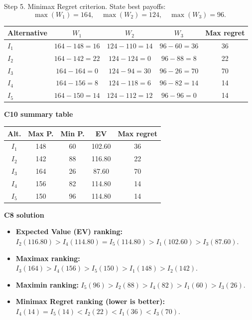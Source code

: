 \begin{ExamProblems}
		Step 5. Minimax Regret criterion.
		State best payoffs:
		\[
		\max(W_1)=164,\quad \max(W_2)=124,\quad \max(W_3)=96.
		\]
		\begin{center}
			\begin{tabular}{l c c c c}
				\toprule
				Alternative & $W_1$ & $W_2$ & $W_3$ & Max regret \\
				\midrule
				$I_1$ & $164-148=16$ & $124-110=14$ & $96-60=36$ & 36 \\
				$I_2$ & $164-142=22$ & $124-124=0$ & $96-88=8$ & 22 \\
				$I_3$ & $164-164=0$ & $124-94=30$ & $96-26=70$ & 70 \\
				$I_4$ & $164-156=8$ & $124-118=6$ & $96-82=14$ & 14 \\
				$I_5$ & $164-150=14$ & $124-112=12$ & $96-96=0$ & 14 \\
				\bottomrule
			\end{tabular}
		\end{center}

		\textbf{C10 summary table}
		\begin{center}
			\begin{tabular}{c c c c c}
				\toprule
				Alt. & Max P. & Min P. & EV & Max regret \\
				\midrule
				$I_1$ & 148 & 60 & 102.60 & 36 \\
				$I_2$ & 142 & 88 & 116.80 & 22 \\
				$I_3$ & 164 & 26 & 87.60 & 70 \\
				$I_4$ & 156 & 82 & 114.80 & 14 \\
				$I_5$ & 150 & 96 & 114.80 & 14 \\
				\bottomrule
			\end{tabular}
		\end{center}

		\textbf{C8 solution}
		\begin{itemize}
			\item \textbf{Expected Value (EV) ranking:} $I_2(116.80)>I_4(114.80)=I_5(114.80)>I_1(102.60)>I_3(87.60)$.
			\item \textbf{Maximax ranking:} $I_3(164)>I_4(156)>I_5(150)>I_1(148)>I_2(142)$.
			\item \textbf{Maximin ranking:} $I_5(96)>I_2(88)>I_4(82)>I_1(60)>I_3(26)$.
			\item \textbf{Minimax Regret ranking (lower is better):} $I_4(14)=I_5(14)<I_2(22)<I_1(36)<I_3(70)$.
		\end{itemize}


\end{ExamProblems}
